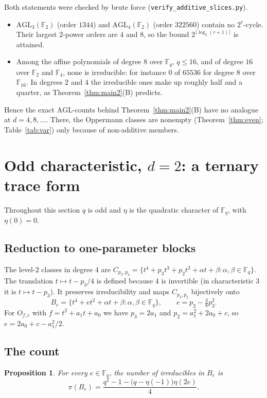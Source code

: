 \documentclass[11pt,a4paper]{amsart}
\newtheorem{proposition}[theorem]{Proposition}
\theoremstyle{definition}
\theoremstyle{remark}
\newcommand{\F}{\mathbb{F}}
\begin{document}
Both statements were checked by brute force (\texttt{verify\_additive\_slices.py}).
\begin{itemize}
\item $\mathrm{AGL}_3(\F_2)$ (order $1344$) and $\mathrm{AGL}_4(\F_2)$ (order $322560$) contain no $2^r$-cycle. Their
largest $2$-power orders are $4$ and $8$, so the bound $2^{\lceil\log_2(r+1)\rceil}$ is attained.
\item Among the affine polynomials of degree $8$ over $\F_q$, $q\le16$, and of degree $16$ over $\F_2$ and $\F_4$,
none is irreducible: for instance $0$ of $65536$ for degree $8$ over $\F_{16}$. In degrees $2$ and $4$ the
irreducible ones make up roughly half and a quarter, as Theorem~\ref{thm:main2}(B) predicts.
\end{itemize}
Hence the exact $\mathrm{AGL}$-counts behind Theorem~\ref{thm:main2}(B) have no analogue at $d=4,8,\dots$.
There, the Oppermann classes are nonempty (Theorem~\ref{thm:even}; Table~\ref{tab:var}) only because of
non-additive members.


\section{\texorpdfstring{Odd characteristic, $d=2$: a ternary trace form}{Odd characteristic, d=2: a ternary trace form}}\label{sec:odd2}

Throughout this section $q$ is odd and $\eta$ is the quadratic character of $\F_q$, with $\eta(0)=0$.

\subsection{Reduction to one-parameter blocks}
The level-$2$ classes in degree $4$ are $C_{p_3,p_2}=\{t^4+p_3t^3+p_2t^2+\alpha t+\beta:\alpha,\beta\in\F_q\}$. The
translation $t\mapsto t-p_3/4$ is defined because $4$ is invertible (in characteristic $3$ it is $t\mapsto t-p_3$).
It preserves irreducibility and maps $C_{p_3,p_2}$ bijectively onto
\[
B_e=\{t^4+et^2+\alpha t+\beta:\alpha,\beta\in\F_q\},\qquad e=p_2-\tfrac38p_3^2 .
\]
For $O_{f,c}$ with $f=t^2+a_1t+a_0$ we have $p_3=2a_1$ and $p_2=a_1^2+2a_0+c$, so $e=2a_0+c-a_1^2/2$.

\subsection{The count}
\begin{proposition}\label{prop:odd2}
For every $e\in\F_q$, the number of irreducibles in $B_e$ is
\[
\pi(B_e)=\frac{q^2-1-\bigl(q-\eta(-1)\bigr)\eta(2e)}{4}.
\]
\end{proposition}
\end{document}
